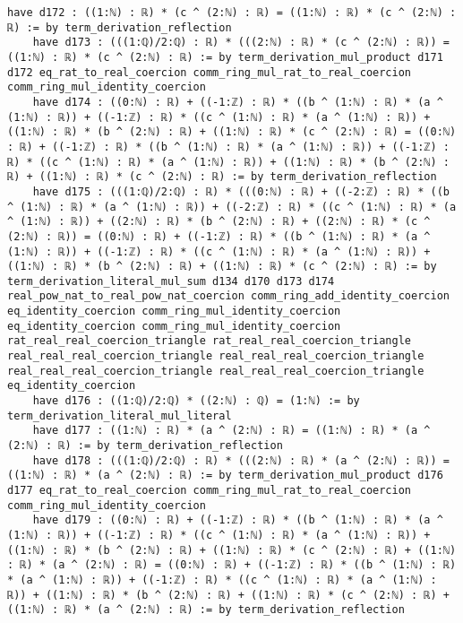 \documentclass{article}
\begin{document}
\begin{tcolorbox}[colback=white!10, width=\linewidth]
\begin{lstlisting}[language=Lean4]
    have d172 : ((1:ℕ) : ℝ) * (c ^ (2:ℕ) : ℝ) = ((1:ℕ) : ℝ) * (c ^ (2:ℕ) : ℝ) := by term_derivation_reflection
    have d173 : (((1:ℚ)/2:ℚ) : ℝ) * (((2:ℕ) : ℝ) * (c ^ (2:ℕ) : ℝ)) = ((1:ℕ) : ℝ) * (c ^ (2:ℕ) : ℝ) := by term_derivation_mul_product d171 d172 eq_rat_to_real_coercion comm_ring_mul_rat_to_real_coercion comm_ring_mul_identity_coercion
    have d174 : ((0:ℕ) : ℝ) + ((-1:ℤ) : ℝ) * ((b ^ (1:ℕ) : ℝ) * (a ^ (1:ℕ) : ℝ)) + ((-1:ℤ) : ℝ) * ((c ^ (1:ℕ) : ℝ) * (a ^ (1:ℕ) : ℝ)) + ((1:ℕ) : ℝ) * (b ^ (2:ℕ) : ℝ) + ((1:ℕ) : ℝ) * (c ^ (2:ℕ) : ℝ) = ((0:ℕ) : ℝ) + ((-1:ℤ) : ℝ) * ((b ^ (1:ℕ) : ℝ) * (a ^ (1:ℕ) : ℝ)) + ((-1:ℤ) : ℝ) * ((c ^ (1:ℕ) : ℝ) * (a ^ (1:ℕ) : ℝ)) + ((1:ℕ) : ℝ) * (b ^ (2:ℕ) : ℝ) + ((1:ℕ) : ℝ) * (c ^ (2:ℕ) : ℝ) := by term_derivation_reflection
    have d175 : (((1:ℚ)/2:ℚ) : ℝ) * (((0:ℕ) : ℝ) + ((-2:ℤ) : ℝ) * ((b ^ (1:ℕ) : ℝ) * (a ^ (1:ℕ) : ℝ)) + ((-2:ℤ) : ℝ) * ((c ^ (1:ℕ) : ℝ) * (a ^ (1:ℕ) : ℝ)) + ((2:ℕ) : ℝ) * (b ^ (2:ℕ) : ℝ) + ((2:ℕ) : ℝ) * (c ^ (2:ℕ) : ℝ)) = ((0:ℕ) : ℝ) + ((-1:ℤ) : ℝ) * ((b ^ (1:ℕ) : ℝ) * (a ^ (1:ℕ) : ℝ)) + ((-1:ℤ) : ℝ) * ((c ^ (1:ℕ) : ℝ) * (a ^ (1:ℕ) : ℝ)) + ((1:ℕ) : ℝ) * (b ^ (2:ℕ) : ℝ) + ((1:ℕ) : ℝ) * (c ^ (2:ℕ) : ℝ) := by term_derivation_literal_mul_sum d134 d170 d173 d174 real_pow_nat_to_real_pow_nat_coercion comm_ring_add_identity_coercion eq_identity_coercion comm_ring_mul_identity_coercion eq_identity_coercion comm_ring_mul_identity_coercion rat_real_real_coercion_triangle rat_real_real_coercion_triangle real_real_real_coercion_triangle real_real_real_coercion_triangle real_real_real_coercion_triangle real_real_real_coercion_triangle eq_identity_coercion
    have d176 : ((1:ℚ)/2:ℚ) * ((2:ℕ) : ℚ) = (1:ℕ) := by term_derivation_literal_mul_literal
    have d177 : ((1:ℕ) : ℝ) * (a ^ (2:ℕ) : ℝ) = ((1:ℕ) : ℝ) * (a ^ (2:ℕ) : ℝ) := by term_derivation_reflection
    have d178 : (((1:ℚ)/2:ℚ) : ℝ) * (((2:ℕ) : ℝ) * (a ^ (2:ℕ) : ℝ)) = ((1:ℕ) : ℝ) * (a ^ (2:ℕ) : ℝ) := by term_derivation_mul_product d176 d177 eq_rat_to_real_coercion comm_ring_mul_rat_to_real_coercion comm_ring_mul_identity_coercion
    have d179 : ((0:ℕ) : ℝ) + ((-1:ℤ) : ℝ) * ((b ^ (1:ℕ) : ℝ) * (a ^ (1:ℕ) : ℝ)) + ((-1:ℤ) : ℝ) * ((c ^ (1:ℕ) : ℝ) * (a ^ (1:ℕ) : ℝ)) + ((1:ℕ) : ℝ) * (b ^ (2:ℕ) : ℝ) + ((1:ℕ) : ℝ) * (c ^ (2:ℕ) : ℝ) + ((1:ℕ) : ℝ) * (a ^ (2:ℕ) : ℝ) = ((0:ℕ) : ℝ) + ((-1:ℤ) : ℝ) * ((b ^ (1:ℕ) : ℝ) * (a ^ (1:ℕ) : ℝ)) + ((-1:ℤ) : ℝ) * ((c ^ (1:ℕ) : ℝ) * (a ^ (1:ℕ) : ℝ)) + ((1:ℕ) : ℝ) * (b ^ (2:ℕ) : ℝ) + ((1:ℕ) : ℝ) * (c ^ (2:ℕ) : ℝ) + ((1:ℕ) : ℝ) * (a ^ (2:ℕ) : ℝ) := by term_derivation_reflection

\end{lstlisting}
\end{tcolorbox}
\end{document}
